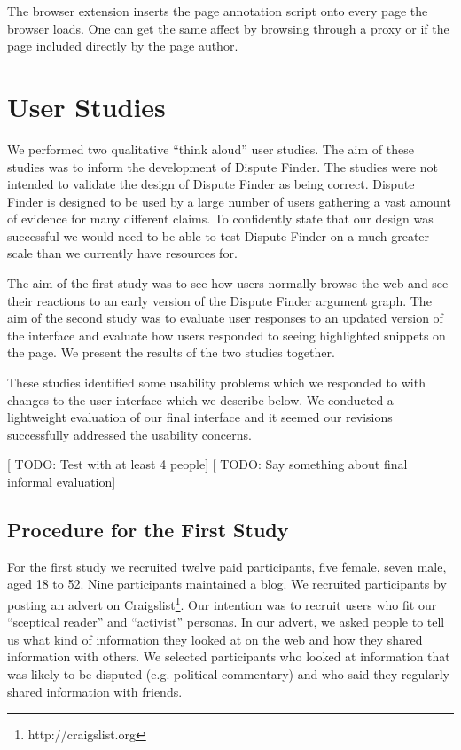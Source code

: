 \documentclass{www2010-submission}
\newcommand{\todo}[1]{{[\color{blue} TODO: #1]}}
\begin{document}
The browser extension inserts the page annotation script onto every page the browser loads. One can get the same affect by browsing through a proxy or if the page included directly by the page author.




\section{User Studies}

We performed two qualitative ``think aloud'' user studies. The aim of these studies was to inform the development of Dispute Finder. The studies were not intended to validate the design of Dispute Finder as being correct. Dispute Finder is designed to be used by a large number of users gathering a vast amount of evidence for many different claims. To confidently state that our design was successful we would need to be able to test Dispute Finder on a much greater scale than we currently have resources for.

The aim of the first study was to see how users normally browse the web and see their reactions to an early version of the Dispute Finder argument graph. The aim of the second study was to evaluate user responses to an updated version of the interface and evaluate how users responded to seeing highlighted snippets on the page. We present the results of the two studies together.

These studies identified some usability problems which we responded to with changes to the user interface which we describe below. We conducted a lightweight evaluation of our final interface and it seemed our revisions successfully addressed the usability concerns.

\todo{Test with at least 4 people}
\todo{Say something about final informal evaluation}


\subsection{Procedure for the First Study}

For the first study we recruited twelve paid participants, five female, seven male, aged 18 to 52. Nine participants maintained a blog. We recruited participants by posting an advert on Craigslist\footnote{http://craigslist.org}.
Our intention was to recruit users who fit our ``sceptical reader'' and ``activist'' personas. In our advert, we asked people to tell us what kind of information they looked at on the web and how they shared information with others. We selected participants who looked at information that was likely to be disputed (e.g. political commentary) and who said they regularly shared information with friends. 
\end{document}
